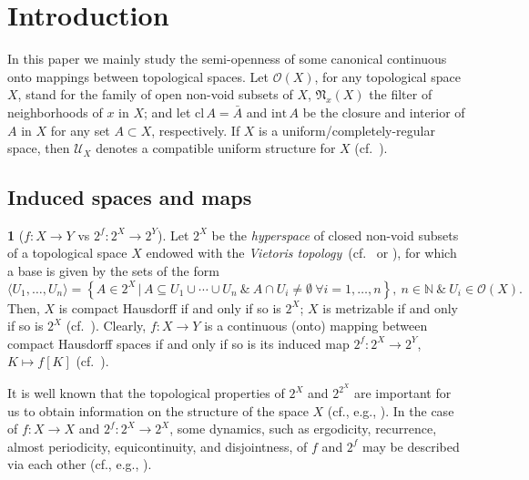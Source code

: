 \documentclass[12pt,final,3p,times]{elsarticle}
\theoremstyle{definition}
\newtheorem{sse}[sthm]{}
\numberwithin{equation}{section}
\begin{document}
\section{Introduction}
In this paper we mainly study the semi-openness of some canonical continuous onto mappings between topological spaces.
Let $\mathscr{O}(X)$, for any topological space $X$, stand for the family of open non-void subsets of $X$, $\mathfrak{N}_x(X)$ the filter of neighborhoods of $x$ in $X$; and let $\textrm{cl}\,A=\bar{A}$ and $\textrm{int}\,A$ be the closure and interior of $A$ in $X$ for any set $A\subset X$, respectively. If $X$ is a uniform/completely-regular space, then $\mathscr{U}_X$ denotes a compatible uniform structure for $X$ (cf.~\cite[Chap.~6]{K55}).

\subsection{Induced spaces and maps}
\begin{sse}[$f\colon X\rightarrow Y$ vs $2^f\colon 2^X\rightarrow2^Y$]
Let $2^X$ be the \textit{hyperspace} of closed non-void subsets of a topological space $X$
endowed with the {\it Vietoris topology}~(cf.~\cite[IX.1]{G76} or \cite[II.1]{Wo}), for which a base is given by the sets of the form
$$
\langle U_1,\dotsc,U_n\rangle=\left\{A\in 2^X\,|\,A\subseteq U_1\cup\dotsm\cup U_n\ \&\ A\cap U_i\not=\emptyset\ \forall i=1,\dotsc,n\right\},\ n\in\mathbb{N}\ \&\ U_i\in\mathscr{O}(X).
$$
Then, $X$ is compact Hausdorff if and only if so is $2^X$; $X$ is metrizable if and only if so is $2^X$ (cf.~\cite[Thm.~II.1.1]{Wo}). Clearly, $f\colon X\rightarrow Y$ is a continuous (onto) mapping between compact Hausdorff spaces if and only if so is its induced map $2^f\colon 2^X\rightarrow 2^Y$, $K\mapsto f[K]$ (cf.~\cite[Thm.~II.1.3a]{Wo}). 

It is well known that the topological properties of $2^X$ and $2^{2^X}$ are important for us to obtain information on the structure of the space $X$ (cf., e.g., \cite{K42, N68, IN}). In the case of $f\colon X\rightarrow X$ and $2^f\colon 2^X\rightarrow2^X$, some dynamics, such as ergodicity, recurrence, almost periodicity, equicontinuity, and disjointness, of $f$ and $2^f$ may be described via each other (cf., e.g., \cite{K75, G76, AG77, Wo, GW95, G00, CKN, LYY, AAN, LOYZ, HSY, N22, JO}).
\end{sse}
\end{document}
